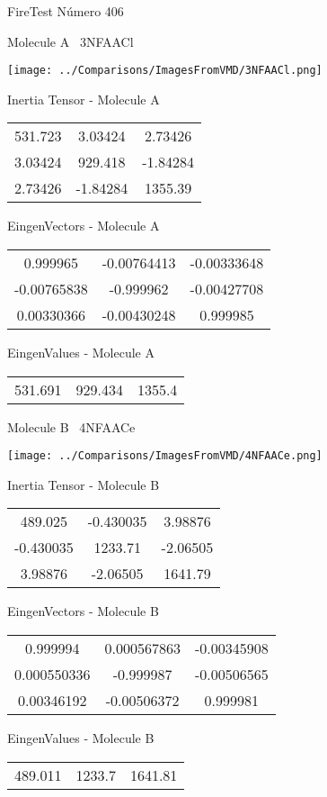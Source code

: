 \vtab[-3cm]
\begin{center}
{\large FireTest \tab Número 406}
\end{center}
\begin{multicols}{2}
\begin{center}

Molecule A \
3NFAACl

\texttt{[image: ../Comparisons/ImagesFromVMD/3NFAACl.png]}

Inertia Tensor - Molecule A \\
\begin{tabular}{|c c c|}
531.723	 & 	3.03424	 & 	2.73426	 \\
3.03424	 & 	929.418	 & 	-1.84284	 \\
2.73426	 & 	-1.84284	 & 	1355.39
\end{tabular}

\vtab
 EingenVectors - Molecule A     \\
\begin{tabular}{|c c c|}
0.999965	 & 	-0.00764413	 & 	-0.00333648	 \\
-0.00765838	 & 	-0.999962	 & 	-0.00427708	 \\
0.00330366	 & 	-0.00430248	 & 	0.999985
\end{tabular}

\vtab
 EingenValues - Molecule A     \\
\begin{tabular}{|c c c|}
531.691	 & 	929.434	 & 	1355.4	 \\
\end{tabular}
\columnbreak

Molecule B \
4NFAACe

\texttt{[image: ../Comparisons/ImagesFromVMD/4NFAACe.png]}

Inertia Tensor - Molecule B \\
\begin{tabular}{|c c c|}
489.025	 & 	-0.430035	 & 	3.98876	 \\
-0.430035	 & 	1233.71	 & 	-2.06505	 \\
3.98876	 & 	-2.06505	 & 	1641.79
\end{tabular}

\vtab
 EingenVectors - Molecule B     \\
\begin{tabular}{|c c c|}
0.999994	 & 	0.000567863	 & 	-0.00345908	 \\
0.000550336	 & 	-0.999987	 & 	-0.00506565	 \\
0.00346192	 & 	-0.00506372	 & 	0.999981
\end{tabular}

\vtab
 EingenValues - Molecule B     \\
\begin{tabular}{|c c c|}
489.011	 & 	1233.7	 & 	1641.81	 \\
\end{tabular}

\end{center}
\end{multicols}

